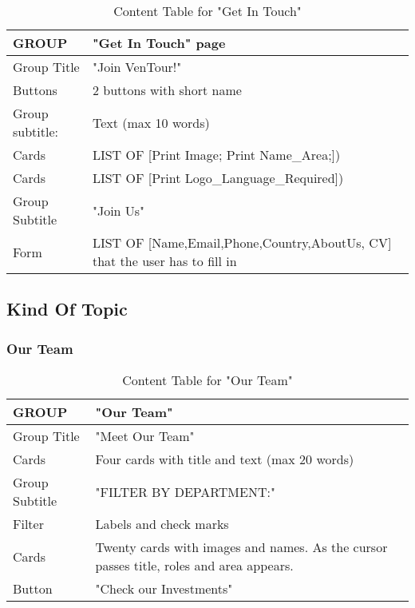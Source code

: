 \documentclass[../../DD.tex]{subfiles}
\begin{document}
     \begin{table}[!htb]
    \begin{tabular}{ |l|p{}| }
    \hline
    GROUP & "Get In Touch" page\\
    \hline
    Group Title & "Join VenTour!" \\
    \hline
    Buttons & 2 buttons with short name\\
    \hline
    Group subtitle: & Text (max 10 words)\\
    \hline
    Cards & LIST OF [Print Image; Print Name\_Area;])\\
    \hline
    Cards & LIST OF [Print Logo\_Language\_Required])\\ 
    \hline
    Group Subtitle & "Join Us"\\ 
    \hline
    Form & LIST OF [Name,Email,Phone,Country,AboutUs, CV] that the user has to fill in\\
    \hline    
\end{tabular}
\caption{Content Table for "Get In Touch"}
\end{table} 
\clearpage
	
\subsection{Kind Of Topic}

    \subsubsection{Our Team}

     \begin{table}[!htb]
    \begin{tabular}{ |l|p{}| }
    \hline
    GROUP & "Our Team"\\
    \hline
    Group Title & "Meet Our Team" \\
    \hline
    Cards & Four cards with title and text (max 20 words)\\
    \hline
    Group Subtitle & "FILTER BY DEPARTMENT:" \\
    \hline
    Filter & Labels and check marks \\
    \hline
    Cards & Twenty cards with images and names. As the cursor passes title, roles and area appears.\\
    \hline
    Button & "Check our Investments" \\
    \hline
\end{tabular}
\caption{Content Table for "Our Team"}
\end{table}  
    
\end{document}
